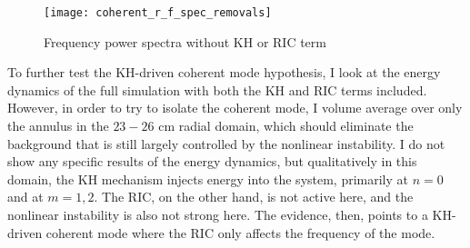 \begin{figure}
\centerline{\texttt{[image: coherent\_r\_f\_spec\_removals]}}
\caption{Frequency power spectra without KH or RIC term}
\label{coherent_r_f_spec_removals}
\end{figure}

To further test the KH-driven coherent mode hypothesis, I look at the energy dynamics of the full simulation with both the KH and RIC terms included. However, in order to try to isolate the coherent
mode, I volume average over only the annulus in the $23-26$ cm radial domain, which should eliminate the background that is still largely controlled by the nonlinear instability. I do not show
any specific results of the energy dynamics, but qualitatively in this domain, the KH mechanism injects energy into the system, primarily at $n=0$ and at $m=1,2$. The RIC, on the other hand,
is not active here, and the nonlinear instability is also not strong here. The evidence, then, points to a KH-driven coherent mode where the RIC only affects the frequency of the mode.

